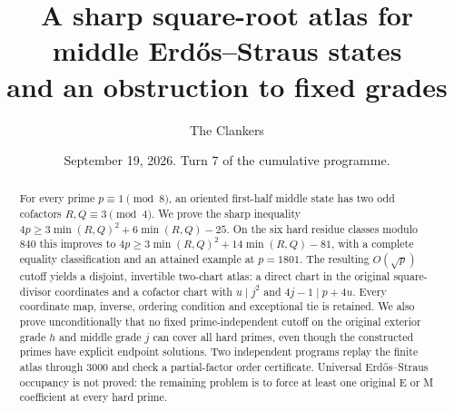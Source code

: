 \documentclass[10pt,reqno]{amsart}
\title[Square-root middle atlas]{A sharp square-root atlas for middle Erd\H{o}s--Straus states\\
and an obstruction to fixed grades}
\author{The Clankers}
\date{September 19, 2026. Turn 7 of the cumulative programme.}
\begin{document}
\begin{abstract}
For every prime $p\equiv1\pmod8$, an oriented first-half middle state has
two odd cofactors $R,Q\equiv3\pmod4$.  We prove the sharp inequality
$4p\ge3\min(R,Q)^2+6\min(R,Q)-25$.  On the six hard residue classes modulo
$840$ this improves to $4p\ge3\min(R,Q)^2+14\min(R,Q)-81$, with a complete
equality classification and an attained example at $p=1801$.  The resulting
$O(\sqrt p)$ cutoff yields a disjoint, invertible two-chart atlas: a direct
chart in the original square-divisor coordinates and a cofactor chart with
$u\mid j^2$ and $4j-1\mid p+4u$.  Every coordinate map, inverse, ordering
condition and exceptional tie is retained.  We also prove unconditionally
that no fixed prime-independent cutoff on the original exterior grade $h$ and
middle grade $j$ can cover all hard primes, even though the constructed primes
have explicit endpoint solutions.  Two independent programs replay the finite
atlas through $3000$ and check a partial-factor order certificate.  Universal
Erd\H{o}s--Straus occupancy is not proved: the remaining problem is to force
at least one original E or M coefficient at every hard prime.
\end{abstract}
\maketitle


\end{document}
